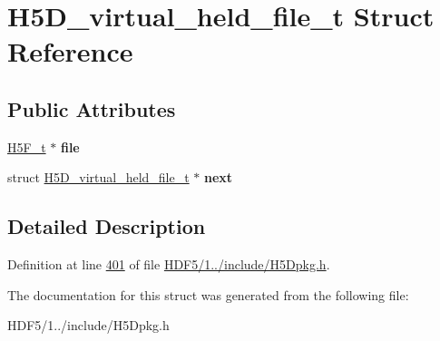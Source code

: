 \hypertarget{struct_h5_d__virtual__held__file__t}{}\section{H5\+D\+\_\+virtual\+\_\+held\+\_\+file\+\_\+t Struct Reference}
\label{struct_h5_d__virtual__held__file__t}
\subsection*{Public Attributes}
\begin{DoxyCompactItemize}
\item 
\mbox{\label{struct_h5_d__virtual__held__file__t_ae9e78ef9eaa0905a624953ec4020de30}} 
\hyperlink{struct_h5_f__t}{H5\+F\+\_\+t} $\ast$ {\bfseries file}
\item 
\mbox{\label{struct_h5_d__virtual__held__file__t_ab551591f7eed171416419c6ed9a7c362}} 
struct \hyperlink{struct_h5_d__virtual__held__file__t}{H5\+D\+\_\+virtual\+\_\+held\+\_\+file\+\_\+t} $\ast$ {\bfseries next}
\end{DoxyCompactItemize}


\subsection{Detailed Description}


Definition at line \hyperlink{_h_d_f5_21_810_81_2include_2_h5_dpkg_8h_source_l00401}{401} of file \hyperlink{_h_d_f5_21_810_81_2include_2_h5_dpkg_8h_source}{H\+D\+F5/1../include/\+H5\+Dpkg.\+h}.



The documentation for this struct was generated from the following file\+:\begin{DoxyCompactItemize}
\item 
H\+D\+F5/1../include/\+H5\+Dpkg.\+h\end{DoxyCompactItemize}
